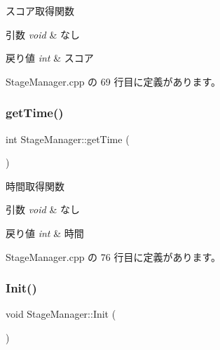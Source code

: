 スコア取得関数 


\begin{DoxyParams}{引数}
{\em void} & なし \\
\hline
\end{DoxyParams}

\begin{DoxyRetVals}{戻り値}
{\em int} & スコア \\
\hline
\end{DoxyRetVals}


 Stage\+Manager.\+cpp の 69 行目に定義があります。

\mbox{\label{class_stage_manager_a861d2cd2829cb25ed06237307f5e98ab}} 
\subsubsection{\texorpdfstring{get\+Time()}{getTime()}}
{\footnotesize\ttfamily int Stage\+Manager\+::get\+Time (\begin{DoxyParamCaption}{ }\end{DoxyParamCaption})}



時間取得関数 


\begin{DoxyParams}{引数}
{\em void} & なし \\
\hline
\end{DoxyParams}

\begin{DoxyRetVals}{戻り値}
{\em int} & 時間 \\
\hline
\end{DoxyRetVals}


 Stage\+Manager.\+cpp の 76 行目に定義があります。

\mbox{\label{class_stage_manager_a6ee187d038d202439d696ff31b347226}} 
\subsubsection{\texorpdfstring{Init()}{Init()}}
{\footnotesize\ttfamily void Stage\+Manager\+::\+Init (\begin{DoxyParamCaption}{ }\end{DoxyParamCaption})}



